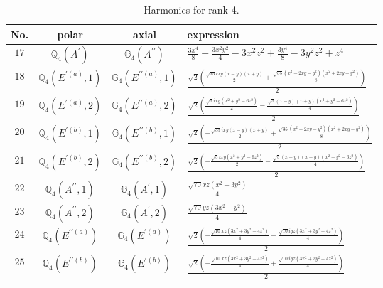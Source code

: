 \documentclass[fleqn,8pt,landscape]{jsarticle}
\begin{document}
\begin{table}[ht!]
\begin{center}
\caption{Harmonics for rank 4.}
\renewcommand{\arraystretch}{1.3}
\begin{tabular}{cccl} \hline \hline
No. & polar & axial & expression \\ \hline
$ 17 $ & $ \mathbb{Q}_{4}(A^{\prime}) $ & $ \mathbb{G}_{4}(A^{\prime\prime}) $ & $ \frac{3 x^{4}}{8} + \frac{3 x^{2} y^{2}}{4} - 3 x^{2} z^{2} + \frac{3 y^{4}}{8} - 3 y^{2} z^{2} + z^{4} $ \\
$ 18 $ & $ \mathbb{Q}_{4}(E^{\prime(a)},1) $ & $ \mathbb{G}_{4}(E^{\prime\prime(a)},1) $ & $ \frac{\sqrt{2} \left(\frac{\sqrt{35} i x y \left(x - y\right) \left(x + y\right)}{2} + \frac{\sqrt{35} \left(x^{2} - 2 x y - y^{2}\right) \left(x^{2} + 2 x y - y^{2}\right)}{8}\right)}{2} $ \\
$ 19 $ & $ \mathbb{Q}_{4}(E^{\prime(a)},2) $ & $ \mathbb{G}_{4}(E^{\prime\prime(a)},2) $ & $ \frac{\sqrt{2} \left(\frac{\sqrt{5} i x y \left(x^{2} + y^{2} - 6 z^{2}\right)}{2} - \frac{\sqrt{5} \left(x - y\right) \left(x + y\right) \left(x^{2} + y^{2} - 6 z^{2}\right)}{4}\right)}{2} $ \\
$ 20 $ & $ \mathbb{Q}_{4}(E^{\prime(b)},1) $ & $ \mathbb{G}_{4}(E^{\prime\prime(b)},1) $ & $ \frac{\sqrt{2} \left(- \frac{\sqrt{35} i x y \left(x - y\right) \left(x + y\right)}{2} + \frac{\sqrt{35} \left(x^{2} - 2 x y - y^{2}\right) \left(x^{2} + 2 x y - y^{2}\right)}{8}\right)}{2} $ \\
$ 21 $ & $ \mathbb{Q}_{4}(E^{\prime(b)},2) $ & $ \mathbb{G}_{4}(E^{\prime\prime(b)},2) $ & $ \frac{\sqrt{2} \left(- \frac{\sqrt{5} i x y \left(x^{2} + y^{2} - 6 z^{2}\right)}{2} - \frac{\sqrt{5} \left(x - y\right) \left(x + y\right) \left(x^{2} + y^{2} - 6 z^{2}\right)}{4}\right)}{2} $ \\
$ 22 $ & $ \mathbb{Q}_{4}(A^{\prime\prime},1) $ & $ \mathbb{G}_{4}(A^{\prime},1) $ & $ \frac{\sqrt{70} x z \left(x^{2} - 3 y^{2}\right)}{4} $ \\
$ 23 $ & $ \mathbb{Q}_{4}(A^{\prime\prime},2) $ & $ \mathbb{G}_{4}(A^{\prime},2) $ & $ \frac{\sqrt{70} y z \left(3 x^{2} - y^{2}\right)}{4} $ \\
$ 24 $ & $ \mathbb{Q}_{4}(E^{\prime\prime(a)}) $ & $ \mathbb{G}_{4}(E^{\prime(a)}) $ & $ \frac{\sqrt{2} \left(- \frac{\sqrt{10} x z \left(3 x^{2} + 3 y^{2} - 4 z^{2}\right)}{4} - \frac{\sqrt{10} i y z \left(3 x^{2} + 3 y^{2} - 4 z^{2}\right)}{4}\right)}{2} $ \\
$ 25 $ & $ \mathbb{Q}_{4}(E^{\prime\prime(b)}) $ & $ \mathbb{G}_{4}(E^{\prime(b)}) $ & $ \frac{\sqrt{2} \left(- \frac{\sqrt{10} x z \left(3 x^{2} + 3 y^{2} - 4 z^{2}\right)}{4} + \frac{\sqrt{10} i y z \left(3 x^{2} + 3 y^{2} - 4 z^{2}\right)}{4}\right)}{2} $ \\
 \hline \hline
\end{tabular}
\end{center}
\end{table}
\end{document}
